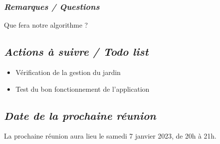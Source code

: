 \documentclass[french,a4paper]{article}
\begin{document}
\subsubsection*{\textit{Remarques / Questions}}
Que fera notre algorithme ?

\subsection*{\textit{Actions à suivre / Todo list}}
\begin{itemize}
  \item Vérification de la gestion du jardin
  \item Test du bon fonctionnement de l'application
\end{itemize}

\subsection*{\textit{Date de la prochaine réunion}}
La prochaine réunion aura lieu le samedi 7 janvier 2023, de 20h à 21h.
\end{document}
